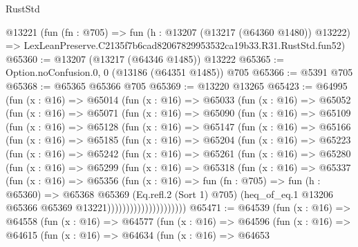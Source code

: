 \begin{lexlean}{RustStd}
\begin{coremodule}
    @13221
    (fun (fn : @705) =>
    fun (h : @13207 (@13217 (@64360 @1480)) @13222) =>
    LexLeanPreserve.C2135f7b6cad82067829953532ca19b33.R31.RustStd.fun52)
@65360 := @13207 (@13217 (@64346 @1485)) @13222
@65365 := Option.noConfusion.{0, 0} (@13186 (@64351 @1485)) @705
@65366 := @5391 @705
@65368 := @65365 @65366 @705
@65369 := @13220 @13265
@65423 := @64995
    (fun (x : @16) =>
    @65014
      (fun (x : @16) =>
      @65033
        (fun (x : @16) =>
        @65052
          (fun (x : @16) =>
          @65071
            (fun (x : @16) =>
            @65090
              (fun (x : @16) =>
              @65109
                (fun (x : @16) =>
                @65128
                  (fun (x : @16) =>
                  @65147
                    (fun (x : @16) =>
                    @65166
                      (fun (x : @16) =>
                      @65185
                        (fun (x : @16) =>
                        @65204
                          (fun (x : @16) =>
                          @65223
                            (fun (x : @16) =>
                            @65242
                              (fun (x : @16) =>
                              @65261
                                (fun (x : @16) =>
                                @65280
                                  (fun (x : @16) =>
                                  @65299
                                    (fun (x : @16) =>
                                    @65318
                                      (fun (x : @16) =>
                                      @65337
                                        (fun (x : @16) =>
                                        @65356
                                          (fun (x : @16) =>
                                          fun (fn : @705) =>
                                          fun (h : @65360) =>
                                          @65368
                                            @65369
                                            (Eq.refl.{2} (Sort 1) @705)
                                            (heq_of_eq.{1}
                                              @13206
                                              @65366
                                              @65369
                                              @13221)))))))))))))))))))))
@65471 := @64539
    (fun (x : @16) =>
    @64558
      (fun (x : @16) =>
      @64577
        (fun (x : @16) =>
        @64596
          (fun (x : @16) =>
          @64615
            (fun (x : @16) =>
            @64634
              (fun (x : @16) =>
              @64653

\end{coremodule}
\end{lexlean}
